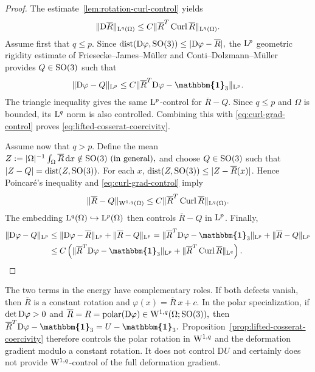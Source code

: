 \documentclass[11pt]{article}
\newcommand{\id}{{\boldsymbol{\mathbbm{1}}}}
\begin{document}
\begin{proof}
The estimate~\ref{lem:rotation-curl-control} yields
\begin{align}
\label{eq:curl-grad-control}
\|{\rm D} \overline R\|_{{\rm L}^q(\Omega)}
\leq
C\|\overline R^T\operatorname{Curl} \overline R\|_{{\rm L}^q(\Omega)}.
\end{align}
Assume first that $q\leq p$. Since
$
\operatorname{dist}({\rm D}\varphi,{\rm SO}(3))
\leq|{\rm D}\varphi-\overline R|,
$
the ${\rm L}^p$ geometric rigidity estimate of Friesecke--James--M\"uller \cite{Mueller02} and Conti--Dolzmann--M\"uller \cite{conti2014korn} provides $ Q \in {\rm SO}(3)$ such that
\begin{align}
\|{\rm D}\varphi- Q \|_{{\rm L}^p}
\leq
C\|\overline R^T{\rm D}\varphi-\id_3\|_{{\rm L}^p}.
\end{align}
The triangle inequality gives the same ${\rm L}^p$-control for $\overline R- Q$. Since $q\leq p$ and $\Omega$ is bounded, its ${\rm L}^q$ norm is also controlled. Combining this with \eqref{eq:curl-grad-control} proves \eqref{eq:lifted-cosserat-coercivity}.

Assume now that $q>p$. Define the mean
$
Z :=|\Omega|^{-1}\int_\Omega \overline R\,\mathrm dx\notin{\rm SO}(3) \ \text{(in general)},
$
and choose $ Q \in {\rm SO}(3)$ such that
$
|Z - Q |=\operatorname{dist}(Z ,{\rm SO}(3)).
$
For each $x$, $\operatorname{dist}(Z ,{\rm SO}(3))\leq|Z -\overline R(x)|$. Hence Poincar\'e's inequality and \eqref{eq:curl-grad-control} imply
\begin{align}
\|\overline R- Q \|_{{\rm W}^{1,q}(\Omega)}
\leq
C\|\overline R^T\operatorname{Curl}\overline R\|_{{\rm L}^q(\Omega)}.
\end{align}
The embedding ${\rm L}^q(\Omega)\hookrightarrow {\rm L}^p(\Omega)$ then controls $\overline R- Q $ in ${\rm L}^p$. Finally,
\begin{align}
\|{\rm D}\varphi-Q\|_{{\rm L}^p}
&\leq
\|{\rm D}\varphi-\overline R\|_{{\rm L}^p}
+
\|\overline R-Q\|_{{\rm L}^p}
=
\|\overline R^T{\rm D}\varphi-\id_3\|_{{\rm L}^p}
+
\|\overline R-Q\|_{{\rm L}^p}
\\
&\leq
C\left(
\|\overline R^T{\rm D}\varphi-\id_3\|_{{\rm L}^p}
+
\|\overline R^T\operatorname{Curl}\overline R\|_{{\rm L}^q}
\right).\qedhere\notag
\end{align}

\end{proof}

The two terms in the energy have complementary roles. If both defects vanish, then $\overline R$ is a constant rotation and $\varphi(x)= \overline R\ x+c$. In the polar specialization, if $\det{\rm D}\varphi>0$ and
$
\overline R=R=\operatorname{polar}({\rm D}\varphi) 
\in {\rm W}^{1,q}(\Omega;{\rm SO}(3)),
$
then
$
\overline R^T{\rm D}\varphi-\id_3
=U-\id_3.
$
Proposition~\ref{prop:lifted-cosserat-coercivity} therefore controls the polar rotation in ${\rm W}^{1,q}$ and the deformation gradient modulo a constant rotation. It does not control $\mathrm D U$ and certainly does not provide ${\rm W}^{1,q}$-control of the full deformation gradient.
\end{document}
